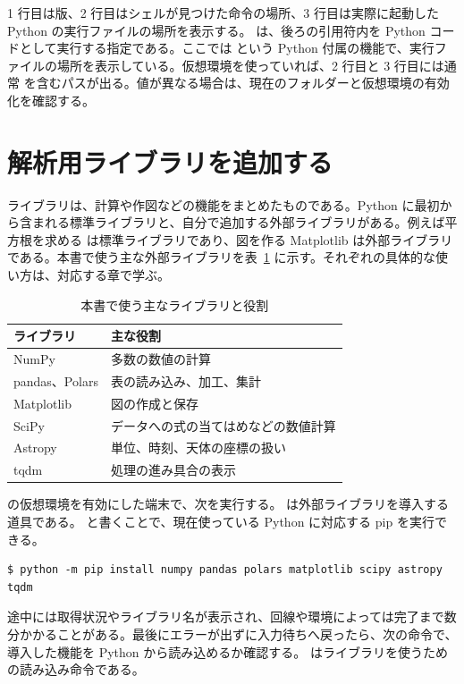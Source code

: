 1 行目は版、2 行目はシェルが見つけた命令の場所、3 行目は実際に起動した Python の実行ファイルの場所を表示する。 は、後ろの引用符内を Python コードとして実行する指定である。ここでは  という Python 付属の機能で、実行ファイルの場所を表示している。仮想環境を使っていれば、2 行目と 3 行目には通常  を含むパスが出る。値が異なる場合は、現在のフォルダーと仮想環境の有効化を確認する。

\section{解析用ライブラリを追加する}
\label{sec:setup-libraries}

ライブラリは、計算や作図などの機能をまとめたものである。Python に最初から含まれる標準ライブラリと、自分で追加する外部ライブラリがある。例えば平方根を求める  は標準ライブラリであり、図を作る Matplotlib は外部ライブラリである。本書で使う主な外部ライブラリを表~\ref{tab:packages} に示す。それぞれの具体的な使い方は、対応する章で学ぶ。

\begin{table}[hbtp]
\centering
\caption{本書で使う主なライブラリと役割}
\label{tab:packages}
\begin{tabular}{ll}
\toprule
ライブラリ & 主な役割 \\
\midrule
NumPy & 多数の数値の計算 \\
pandas、Polars & 表の読み込み、加工、集計 \\
Matplotlib & 図の作成と保存 \\
SciPy & データへの式の当てはめなどの数値計算 \\
Astropy & 単位、時刻、天体の座標の扱い \\
tqdm & 処理の進み具合の表示 \\
\bottomrule
\end{tabular}
\end{table}

 の仮想環境を有効にした端末で、次を実行する。 は外部ライブラリを導入する道具である。 と書くことで、現在使っている Python に対応する pip を実行できる。

\begin{lstlisting}[numbers=none, xleftmargin=2\zw]
$ python -m pip install numpy pandas polars matplotlib scipy astropy tqdm
\end{lstlisting}

途中には取得状況やライブラリ名が表示され、回線や環境によっては完了まで数分かかることがある。最後にエラーが出ずに入力待ちへ戻ったら、次の命令で、導入した機能を Python から読み込めるか確認する。 はライブラリを使うための読み込み命令である。

